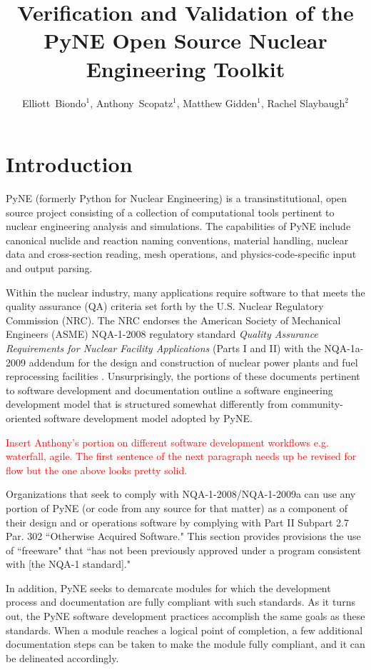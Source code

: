 \documentclass{anstrans}
\title{Verification and Validation of the PyNE Open Source Nuclear Engineering Toolkit}
\author{Elliott~Biondo$^{1}$, Anthony~Scopatz$^{1}$, Matthew Gidden$^{1}$, Rachel Slaybaugh$^{2}$}
\institute{
\and $^{1}$ The University of Wisconsin-Madison, 1500 Engineering Drive, Madison, WI 53706\\
\and $^{2}$ The University of California, Berkeley, 2521 Hearst Ave, Berkeley, CA 94709 \\
}
\begin{document}
\section{Introduction}

PyNE \cite{scopatz_pyne} (formerly Python for Nuclear Engineering) is a
transinstitutional, open source project consisting of a collection of
computational tools pertinent to nuclear engineering analysis and simulations.
The capabilities of PyNE include canonical nuclide and reaction naming
conventions, material handling, nuclear data and cross-section reading, mesh
operations, and physics-code-specific input and output parsing. %

Within the nuclear industry, many applications require software to that meets
the quality assurance (QA) criteria set forth by the U.S. Nuclear Regulatory
Commission (NRC). The NRC endorses the American Society of Mechanical Engineers
(ASME) NQA-1-2008 regulatory standard \emph{Quality Assurance Requirements for
Nuclear Facility Applications} (Parts I and II) \cite{nrc} with the NQA-1a-2009
addendum \cite{add} for the design and construction of nuclear power plants and
fuel reprocessing facilities \cite{nrc}. Unsurprisingly, the portions of these
documents pertinent to software development and documentation outline a
software engineering development model that is structured somewhat differently
from community-oriented software development model adopted by PyNE. 

\textcolor{red}{Insert Anthony's portion on different software development
workflows e.g. waterfall, agile. The first sentence of the next paragraph needs
up be revised for flow but the one above looks pretty solid.}

Organizations that seek to comply with NQA-1-2008/NQA-1-2009a can use any
portion of PyNE (or code from any source for that matter) as a component of
their design and or operations software by complying with Part II Subpart 2.7
Par. 302 ``Otherwise Acquired Software." This section provides provisions the
use of ``freeware" that ``has not been previously approved under a program
consistent with [the NQA-1 standard]." 

In addition, PyNE seeks to demarcate modules for which the development process
and documentation are fully compliant with such standards. As it turns out, the
PyNE software development practices accomplish the same goals as these
standards.  When a module reaches a logical point of completion, a few
additional documentation steps can be taken to make the module fully compliant,
and it can be delineated accordingly.
\end{document}

